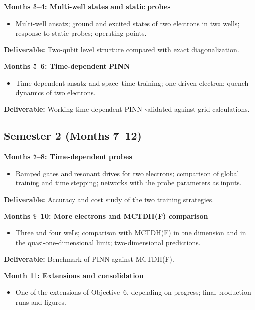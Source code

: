\documentclass[12pt,a4paper]{article}
\begin{document}
\bigskip

\textbf{Months 3--4: Multi-well states and static probes}
\begin{itemize}
    \item Multi-well ansatz; ground and excited states of two
    electrons in two wells; response to static probes; operating
    points.
\end{itemize}
\textbf{Deliverable:} Two-qubit level structure compared with exact
diagonalization.

\bigskip

\textbf{Months 5--6: Time-dependent PINN}
\begin{itemize}
    \item Time-dependent ansatz and space--time training; one driven
    electron; quench dynamics of two electrons.
\end{itemize}
\textbf{Deliverable:} Working time-dependent PINN validated against
grid calculations.

\subsection*{Semester 2 (Months 7--12)}

\textbf{Months 7--8: Time-dependent probes}
\begin{itemize}
    \item Ramped gates and resonant drives for two electrons;
    comparison of global training and time stepping; networks with
    the probe parameters as inputs.
\end{itemize}
\textbf{Deliverable:} Accuracy and cost study of the two training
strategies.

\bigskip

\textbf{Months 9--10: More electrons and MCTDH(F) comparison}
\begin{itemize}
    \item Three and four wells; comparison with MCTDH(F) in one
    dimension and in the quasi-one-dimensional limit; two-dimensional
    predictions.
\end{itemize}
\textbf{Deliverable:} Benchmark of PINN against MCTDH(F).

\bigskip

\textbf{Month 11: Extensions and consolidation}
\begin{itemize}
    \item One of the extensions of Objective~6, depending on progress;
    final production runs and figures.
\end{itemize}
\end{document}
